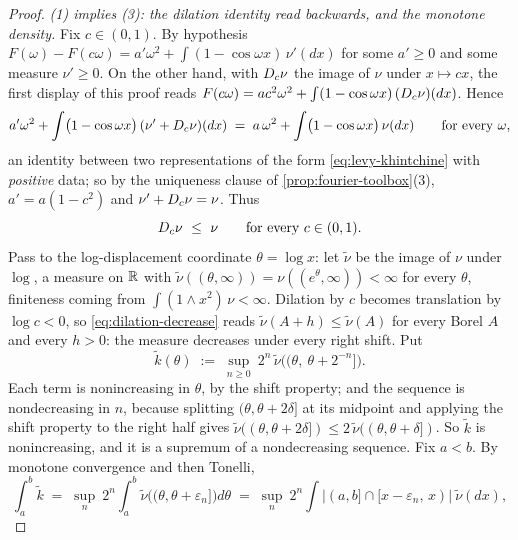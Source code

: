 \begin{proof}
\emph{(1) implies (3): the dilation identity read backwards, and the monotone density.} Fix
$c \in (0,1)$. By hypothesis $F(\omega) - F(c\omega) = a'\omega^2 + \int (1-\cos\omega
x)\,\nu'(dx)$ for some $a' \ge 0$ and some \Levy{} measure $\nu' \ge 0$. On the other hand, with
$D_{c}\nu$ the image of $\nu$ under $x \mapsto cx$, the first display of this proof reads
$F(c\omega) = ac^2\omega^2 + \int (1-\cos\omega x)\,(D_{c}\nu)(dx)$. Hence
\[
  a'\omega^2 + \int \bigl(1 - \cos\omega x\bigr)\,(\nu' + D_{c}\nu)(dx)
  \;=\; a\,\omega^2 + \int \bigl(1 - \cos\omega x\bigr)\,\nu(dx)
  \qquad \text{for every } \omega,
\]
an identity between two representations of the form \ref{eq:levy-khintchine} with
\emph{positive} data; so by the uniqueness clause of \ref{prop:fourier-toolbox}(3),
$a' = a(1-c^2)$ and $\nu' + D_{c}\nu = \nu$. Thus
\begin{equation}\label{eq:dilation-decrease}
  D_{c}\nu \ \le\ \nu \qquad \text{for every } c \in (0,1).
\end{equation}
Pass to the log-displacement coordinate $\theta = \log x$: let $\tilde\nu$ be the image of
$\nu$ under $\log$, a measure on $\mathbb{R}$ with
$\tilde\nu((\theta,\infty)) = \nu((e^\theta,\infty)) < \infty$ for every $\theta$, finiteness
coming from $\int (1 \wedge x^2)\,\nu < \infty$. Dilation by $c$ becomes translation by
$\log c < 0$, so \ref{eq:dilation-decrease} reads $\tilde\nu(A + h) \le \tilde\nu(A)$ for every
Borel $A$ and every $h > 0$: the measure decreases under every right shift. Put
\[
  \tilde k(\theta) \;:=\; \sup_{n \ge 0}\ 2^n\,\tilde\nu\bigl((\theta,\ \theta + 2^{-n}]\bigr).
\]
Each term is nonincreasing in $\theta$, by the shift property; and the sequence is nondecreasing
in $n$, because splitting $(\theta, \theta+2\delta]$ at its midpoint and applying the shift
property to the right half gives
$\tilde\nu((\theta,\theta+2\delta]) \le 2\,\tilde\nu((\theta,\theta+\delta])$. So $\tilde k$ is
nonincreasing, and it is a supremum of a nondecreasing sequence. Fix $a < b$. By monotone
convergence and then Tonelli,
\[
  \int_a^b \tilde k \;=\; \sup_n\ 2^n\!\int_a^b \tilde\nu\bigl((\theta,\theta+\varepsilon_n]\bigr)
    d\theta
  \;=\; \sup_n\ 2^n\!\int \bigl|(a,b] \cap [x - \varepsilon_n,\, x)\bigr|\ \tilde\nu(dx),
\]
\end{proof}
